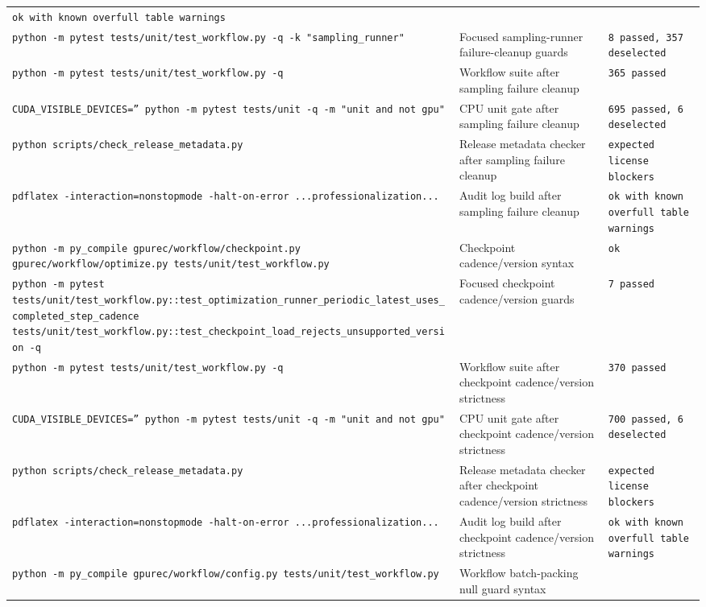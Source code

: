 \documentclass[11pt]{article}
\begin{document}
\begin{center}
\begin{tabular}{lll}
\texttt{ok with known overfull table warnings} \\
\texttt{python -m pytest tests/unit/test\_workflow.py -q -k "sampling\_runner"} &
Focused sampling-runner failure-cleanup guards &
\texttt{8 passed, 357 deselected} \\
\texttt{python -m pytest tests/unit/test\_workflow.py -q} &
Workflow suite after sampling failure cleanup &
\texttt{365 passed} \\
\texttt{CUDA\_VISIBLE\_DEVICES='' python -m pytest tests/unit -q -m "unit and not gpu"} &
CPU unit gate after sampling failure cleanup &
\texttt{695 passed, 6 deselected} \\
\texttt{python scripts/check\_release\_metadata.py} &
Release metadata checker after sampling failure cleanup &
\texttt{expected license blockers} \\
\texttt{pdflatex -interaction=nonstopmode -halt-on-error ...professionalization...} &
Audit log build after sampling failure cleanup &
\texttt{ok with known overfull table warnings} \\
\texttt{python -m py\_compile gpurec/workflow/checkpoint.py gpurec/workflow/optimize.py tests/unit/test\_workflow.py} &
Checkpoint cadence/version syntax &
\texttt{ok} \\
\texttt{python -m pytest tests/unit/test\_workflow.py::test\_optimization\_runner\_periodic\_latest\_uses\_completed\_step\_cadence tests/unit/test\_workflow.py::test\_checkpoint\_load\_rejects\_unsupported\_version -q} &
Focused checkpoint cadence/version guards &
\texttt{7 passed} \\
\texttt{python -m pytest tests/unit/test\_workflow.py -q} &
Workflow suite after checkpoint cadence/version strictness &
\texttt{370 passed} \\
\texttt{CUDA\_VISIBLE\_DEVICES='' python -m pytest tests/unit -q -m "unit and not gpu"} &
CPU unit gate after checkpoint cadence/version strictness &
\texttt{700 passed, 6 deselected} \\
\texttt{python scripts/check\_release\_metadata.py} &
Release metadata checker after checkpoint cadence/version strictness &
\texttt{expected license blockers} \\
\texttt{pdflatex -interaction=nonstopmode -halt-on-error ...professionalization...} &
Audit log build after checkpoint cadence/version strictness &
\texttt{ok with known overfull table warnings} \\
\texttt{python -m py\_compile gpurec/workflow/config.py tests/unit/test\_workflow.py} &
Workflow batch-packing null guard syntax &

\end{tabular}
\end{center}
\end{document}
